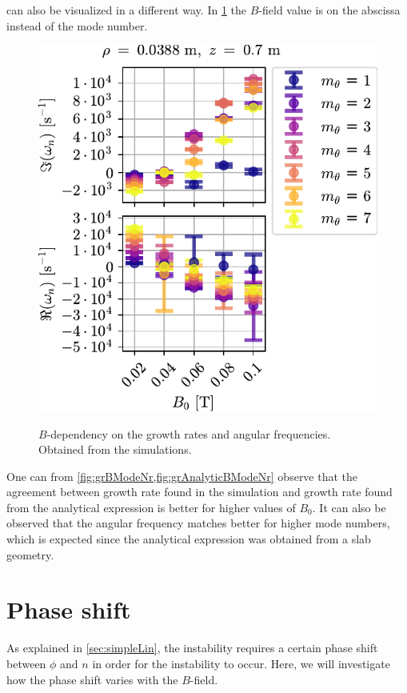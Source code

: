  can also be visualized in a different way.
In \cref{fig:grBModeNr} the $B$-field value is on the abscissa instead of the mode number.
%
\begin{figure}[htb]
        \centering
        \includegraphics{fig/results/growthRates/growthRatesB0ModeNr}
        \label{fig:grBModeNr}
        \caption{$B$-dependency on the growth rates and angular frequencies.
            Obtained from the simulations.}
\end{figure}
%
One can from \cref{fig:grBModeNr,fig:grAnalyticBModeNr} observe that the agreement between growth rate found in the simulation and growth rate found from the analytical expression is better for higher values of $B_0$.
It can also be observed that the angular frequency matches better for higher mode numbers, which is expected since the analytical expression was obtained from a slab geometry.

\section{Phase shift}
%
As explained in \ref{sec:simpleLin}, the instability requires a certain phase shift between $\phi$ and $n$ in order for the instability to occur.
Here, we will investigate how the phase shift varies with the $B$-field.

